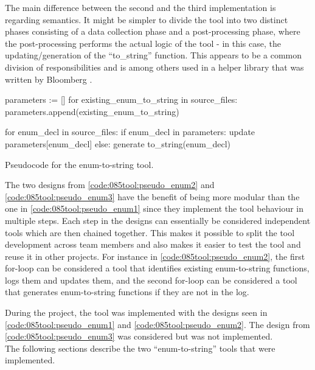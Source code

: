 The main difference between the second and the third implementation is regarding semantics. It might be simpler to divide the tool into two distinct phases consisting of a data collection phase and a post-processing phase, where the post-processing performs the actual logic of the tool - in this case, the updating/generation of the ``to\_string'' function. This appears to be a common division of responsibilities and is among others used in a helper library that was written by Bloomberg \cite{ClangmetatoolFrameworkReusing2023}.

\begin{listing}[H]
    \begin{pythoncode}
parameters := []
for existing_enum_to_string in source_files:
    parameters.append(existing_enum_to_string)

for enum_decl in source_files:
    if enum_decl in parameters:
        update parameters[enum_decl]
    else:
        generate to_string(enum_decl)
    \end{pythoncode}
    \caption{Pseudocode for the enum-to-string tool.}
    \label{code:085tool:pseudo_enum3}
\end{listing}

The two designs from \cref{code:085tool:pseudo_enum2} and \cref{code:085tool:pseudo_enum3} have the benefit of being more modular than the one in \ref{code:085tool:pseudo_enum1} since they implement the tool behaviour in multiple steps.
Each step in the designs can essentially be considered independent tools which are then chained together. This makes it possible to split the tool development across team members and also makes it easier to test the tool and reuse it in other projects. For instance in \cref{code:085tool:pseudo_enum2}, the first for-loop can be considered a tool that identifies existing enum-to-string functions, logs them and updates them, and the second for-loop can be considered a tool that generates enum-to-string functions if they are not in the log.

During the project, the tool was implemented with the designs seen in \cref{code:085tool:pseudo_enum1} and \cref{code:085tool:pseudo_enum2}. The design from \cref{code:085tool:pseudo_enum3} was considered but was not implemented. \\The following sections describe the two ``enum-to-string'' tools that were implemented.